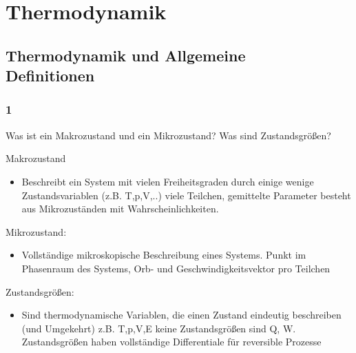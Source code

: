 \chapter{Thermodynamik}
\section{Thermodynamik und Allgemeine\\Definitionen}
\subsection{1}
\begin{myfrag}
Was ist ein Makrozustand und ein Mikrozustand?
Was sind Zustandsgrößen?
\end{myfrag} \qquad \newline
Makrozustand 
\begin{itemize}
\item Beschreibt ein System mit vielen Freiheitsgraden durch einige wenige Zustandsvariablen (z.B. T,p,V,..) viele Teilchen, gemittelte Parameter besteht aus Mikrozuständen mit Wahrscheinlichkeiten.
\end{itemize}
Mikrozustand:
\begin{itemize}
\item Vollständige mikroskopische Beschreibung eines Systems. Punkt im Phasenraum des Systems, Orb- und Geschwindigkeitsvektor pro Teilchen
\end{itemize}
Zustandsgrößen:
\begin{itemize}
\item Sind thermodynamische Variablen, die einen Zustand eindeutig beschreiben (und Umgekehrt) z.B. T,p,V,E keine Zustandsgrößen sind Q, W. Zustandsgrößen haben vollständige Differentiale für reversible Prozesse
\end{itemize}

